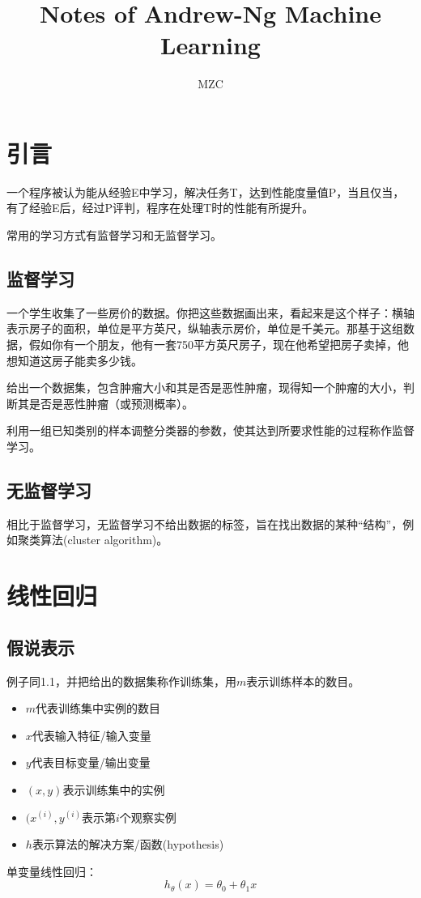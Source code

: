 \documentclass[cn,hazy,blue,normal,14pt]{elegantnote}
\title{Notes of Andrew-Ng Machine Learning}
\author{MZC}
\begin{document}
\maketitle
\tableofcontents
\newpage
\section{引言}
一个程序被认为能从经验E中学习，解决任务T，达到性能度量值P，当且仅当，有了经验E后，经过P评判，程序在处理T时的性能有所提升。

常用的学习方式有监督学习和无监督学习。
\subsection{监督学习}
\begin{example}
一个学生收集了一些房价的数据。你把这些数据画出来，看起来是这个样子：横轴表示房子的面积，单位是平方英尺，纵轴表示房价，单位是千美元。那基于这组数据，假如你有一个朋友，他有一套750平方英尺房子，现在他希望把房子卖掉，他想知道这房子能卖多少钱。
\end{example}

\begin{example}
给出一个数据集，包含肿瘤大小和其是否是恶性肿瘤，现得知一个肿瘤的大小，判断其是否是恶性肿瘤（或预测概率）。
\end{example}
\begin{definition}[监督学习]
利用一组已知类别的样本调整分类器的参数，使其达到所要求性能的过程称作监督学习。
\end{definition}
\subsection{无监督学习}
相比于监督学习，无监督学习不给出数据的标签，旨在找出数据的某种“结构”，例如聚类算法(cluster algorithm)。
\section{线性回归} 
\subsection{假说表示}
例子同1.1，并把给出的数据集称作训练集，用$m$表示训练样本的数目。
\newpage
\begin{itemize}
    \item $m$代表训练集中实例的数目 
    \item $x$代表输入特征/输入变量
    \item $y$代表目标变量/输出变量
    \item $(x,y)$表示训练集中的实例
    \item $(x^{(i)},y^{(i)}$表示第$i$个观察实例
    \item $h$表示算法的解决方案/函数(hypothesis)
\end{itemize}
单变量线性回归：
$$
h_\theta(x)=\theta_0+\theta_1x
$$
\end{document}

